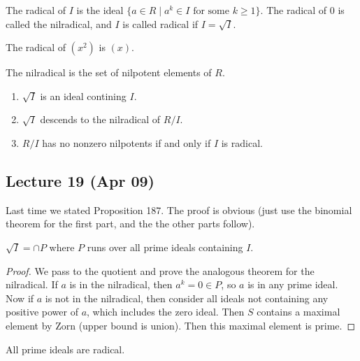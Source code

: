\documentclass[10pt, twoside]{article}
\begin{document}
        \begin{defn}
            The radical of $I$ is the ideal $\{a \in R \mid a^k \in I \text{ for some }k\geq 1\}$. The radical of $0$ is called the nilradical, and $I$ is called radical if $I=\sqrt{I}$.
        \end{defn}

        \begin{exm}
            The radical of $(x^2)$ is $(x)$.
        \end{exm}

    \begin{exm}
        The nilradical is the set of nilpotent elements of $R$.
    \end{exm}

    \begin{prop}
        \begin{enumerate}
            \item $\sqrt{I}$ is an ideal contining $I$.
            \item $\sqrt{I}$ descends to the nilradical of $R/I$.
            \item $R/I$ has no nonzero nilpotents if and only if $I$ is radical.
        \end{enumerate}
    \end{prop}
        
    \subsection{Lecture 19 (Apr 09)}
        Last time we stated Proposition 187. The proof is obvious (just use the binomial theorem for the first part, and the the other parts follow).

    \begin{prop}
        $\sqrt{I} = \cap P$ where $P$ runs over all prime ideals containing $I$.
        \begin{proof}
                We pass to the quotient and prove the analogous theorem for the nilradical. If $a$ is in the nilradical, then $a^k = 0 \in P$, so $a$ is in any prime ideal. Now if $a$ is not in the nilradical, then consider all ideals not containing any positive power of $a$, which includes the zero ideal. Then $S$ contains a maximal element by Zorn (upper bound is union). Then this maximal element is prime.
        \end{proof}
    \end{prop}

    \begin{cor}
        All prime ideals are radical.
    \end{cor}
\end{document}
